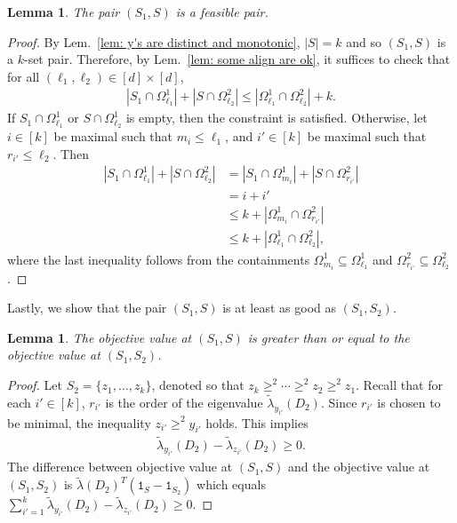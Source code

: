 \documentclass[12pt]{article}
\newtheorem{lem}[thm]{Lemma}
\theoremstyle{definition}
\numberwithin{equation}{section}
\numberwithin{equation}{section}
\newcommand{\la}{\lambda}
\newcommand{\one}{\mathtt{1}}
\newcommand{\Og}{\Omega}
\begin{document}
\begin{lem}
\label{lem: feasiblity of S}
The pair \((S_1, S)\) is a feasible pair. 
\end{lem}
\begin{proof}
By Lem.~\ref{lem: y's are distinct and monotonic}, \(|S|=k\) and so \((S_1, S)\) is a \(k\)-set pair. Therefore, by Lem.~\ref{lem: some align are ok}, it suffices to check that for all \((\ell_1, \ell_2) \in [d] \times [d]\), 
\begin{align}
|S_1 \cap \Og^1_{\ell_1}| + |S \cap \Og^2_{\ell_2}| \leq | \Og^{1}_{\ell_1} \cap \Og^{2}_{\ell_2} | + k.
\end{align}
If \(S_1 \cap \Og^1_{\ell_1}\) or \(S \cap \Og^1_{\ell_2}\) is empty, then the constraint is satisfied. Otherwise, let \(i \in [k]\) be maximal such that \(m_{i} \leq \ell_1\), and \(i' \in [k]\) be maximal such that \(r_{i'} \leq \ell_2\). Then 
\begin{align}
|S_1 \cap \Og^1_{\ell_1}| + |S \cap \Og^2_{\ell_2}| &= |S_1 \cap \Og^1_{m_i}| + |S \cap \Og^2_{r_{i'}}| \\
&= i + i'\\
&\leq k + | \Og^1_{m_i} \cap \Og^2_{r_{i'}}| \\
&\leq k + | \Og^{1}_{\ell_1} \cap \Og^{2}_{\ell_2} |,
\end{align} 
where the last inequality follows from the containments \(\Og^1_{m_i} \subseteq \Og^1_{\ell_1}\) and \(\Og^2_{r_{i'}} \subseteq \Og^2_{\ell_2}\).
\end{proof}



Lastly, we show that the pair \((S_1, S)\) is at least as good as \((S_1, S_2)\).
\begin{lem}
\label{lem: optimal S}
The objective value at \((S_1, S)\) is greater than or equal to the objective value at \((S_1, S_2)\).
\end{lem}
\begin{proof}
Let \(S_2 = \{ z_1, \ldots, z_k\}\), denoted so that \(z_k \geq^2 \cdots \geq^2 z_2 \geq^2 z_1\). Recall that for each \(i' \in [k]\), \(r_{i'}\) is the order of the eigenvalue \(\tilde{\la}_{y_{i'}} (D_2)\). Since \(r_{i'}\) is chosen to be minimal, the inequality \(z_{i'} \geq^2 y_{i'}\) holds. This implies 
\begin{align}
    \tilde{\la}_{y_{i'}}(D_2) - \tilde{\la}_{z_{i'}}(D_2) \geq 0.
\end{align}
The difference between objective value at \((S_1, S)\) and the objective value at \((S_1, S_2)\) is  \(\tilde{\la} (D_2)^T (\one_{S} - \one_{S_2})\) which equals 
\(\sum_{i'=1}^k \tilde{\la}_{y_{i'}}(D_2) - \tilde{\la}_{z_{i'}}(D_2) \geq 0 \).
\end{proof}
\end{document}
